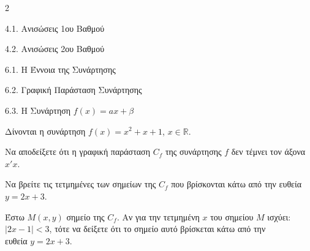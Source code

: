 \begin{ylh}{2}
    \item 4.1. Ανισώσεις 1ου Βαθμού
    \item 4.2. Ανισώσεις 2ου Βαθμού
    \item 6.1. Η Έννοια της Συνάρτησης
    \item 6.2. Γραφική Παράσταση Συνάρτησης
    \item 6.3. Η Συνάρτηση $f(x)=ax+\beta$
\end{ylh}
Δίνονται η συνάρτηση $f(x) = x^2 + x + 1$, $x \in \mathbb{R}$.
\begin{alist}
\item Να αποδείξετε ότι η γραφική παράσταση $C_f$ της συνάρτησης $f$ δεν τέμνει τον άξονα $x'x$.
\item Να βρείτε τις τετμημένες των σημείων της $C_f$ που βρίσκονται κάτω από την ευθεία $y = 2x + 3$.
\item Έστω ${M}(x, y)$ σημείο της $C_f$. Αν για την τετμημένη $x$ του σημείου ${M}$ ισχύει:\\
$|2x - 1| < 3$, τότε να δείξετε ότι το σημείο αυτό βρίσκεται κάτω από την\\
ευθεία $y = 2x + 3$.
\end{alist}

